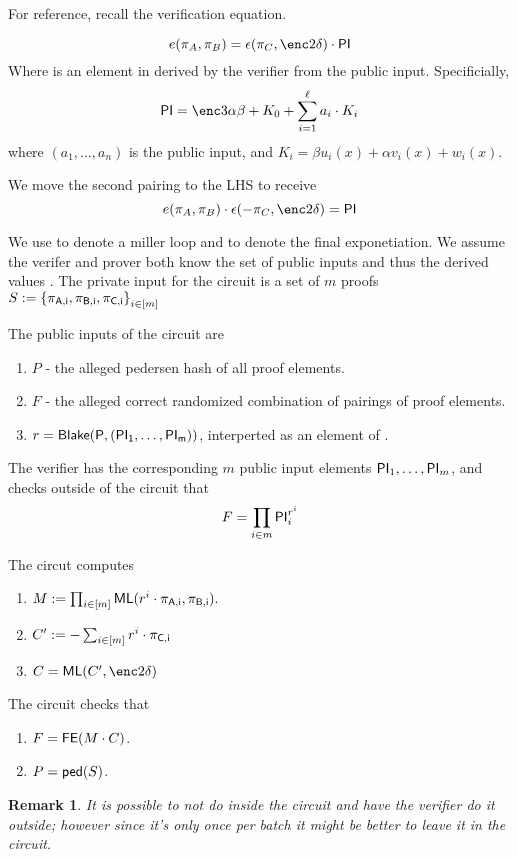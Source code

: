 \documentclass[11pt]{article}
\numberwithin{figure}{section} %
\newtheorem{remark}[thm]{Remark}
\newcommand{\eps}{\epsilon}
\newcommand{\e}{\eps}
\begin{document}
For reference, recall the \groth verification equation.

\[e(\pi_A,\pi_B) =\e(\pi_C,\enc2{\delta})\cdot \PI\]
Where \PI is an element in \Gt derived by the verifier from the public input.
Specificially,
\[\PI=\enc3{\alpha\beta+ K_0+\sum_{i=1}^\ell a_i\cdot K_i}\]
where $(a_1,\ldots,a_n)$ is the public input, and $K_i = \beta u_i(x) + \alpha  v_i (x) + w_i(x)$.

We move the second pairing to the LHS to receive
\[e(\pi_A,\pi_B) \cdot \e(-\pi_C,\enc2{\delta})=  \PI\]


We use \ML to denote a miller loop and \FE to denote the final exponetiation.
We assume the verifer and prover both know the set of public inputs and thus the derived values .
The private input for the circuit is a set of $m$ \groth proofs
$S:= \left\{\mathsf{\pi_{A,i}},\mathsf{\pi_{B,i}},\mathsf{\pi_{C,i}}\right\}_{i\in [m]}$

The public inputs of the circuit are 
\begin{enumerate}
 \item $P$ - the alleged pedersen hash of all proof elements.
 \item $F$ - the alleged correct randomized combination of pairings of proof elements.
 \item  $r=\mathsf{Blake(P,(\mathsf{PI}_1,\ldots,\mathsf{PI}_m))}$, interperted as an element of \F.

\end{enumerate}

The verifier has the  corresponding $m$  public input elements $\mathsf{PI}_1,\ldots,\mathsf{PI}_m$, and checks outside of the circuit that
\[F= \prod_{i\in m} \mathsf{PI}_i ^{r^i}\]


The circut computes
\begin{enumerate}

 \item $M:= \prod_{i\in [m]} \mathsf{ML}(r^i\cdot \mathsf{\pi_{A,i}},\mathsf{\pi_{B,i}}).$
 \item $C' := -\sum_{i\in [m]} r^i\cdot \mathsf{\pi_{C,i}}$
 \item $C=\ML(C',\enc2{\delta})$
 
\end{enumerate}
 The circuit checks that
 \begin{enumerate}
 \item $F=\mathsf{FE}(M\cdot C)$.
 \item $P=\mathsf{ped}(S)$.
 \end{enumerate}

 \begin{remark}
  It is possible to not do \FE inside the circuit and have the verifier do it outside;
  however since it's only once per batch it might be better to leave it in the circuit.
 \end{remark}

 

\end{document}
